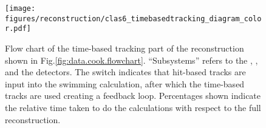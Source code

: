 \begin{figure}\begin{center}
\texttt{[image: \\figures/reconstruction/clas6\_timebasedtracking\_diagram\_color.pdf]}
\caption[Flow chart of the time-based tracking part of the reconstruction]{\label{fig:data.cook.flowchart.timebased}Flow chart of the time-based tracking part of the reconstruction shown in Fig.\ref{fig:data.cook.flowchart}. ``Subsystems'' refers to the , ,  and the  detectors. The switch indicates that hit-based tracks are input into the swimming calculation, after which the time-based tracks are used creating a feedback loop. Percentages shown indicate the relative time taken to do the calculations with respect to the full reconstruction.}
\end{center}\end{figure}




%
%

